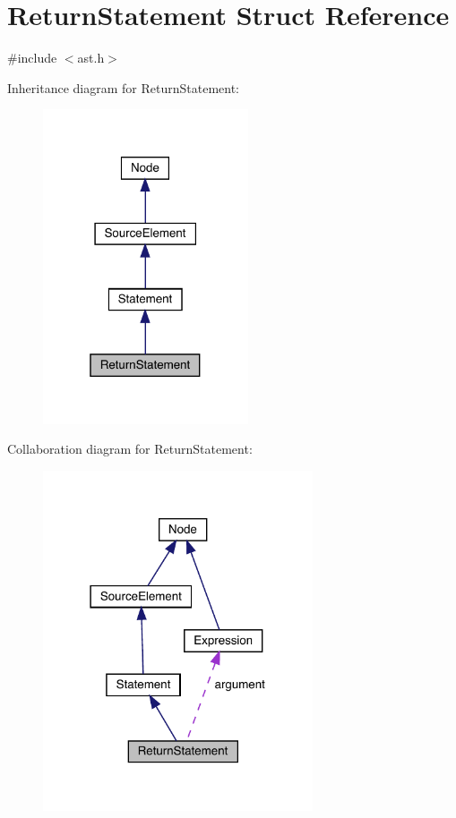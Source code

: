 \hypertarget{struct_return_statement}{}\section{Return\+Statement Struct Reference}
\label{struct_return_statement}


{\ttfamily \#include $<$ast.\+h$>$}



Inheritance diagram for Return\+Statement\+:
\nopagebreak
\begin{figure}[H]
\begin{center}
\leavevmode
\includegraphics[width=172pt]{struct_return_statement__inherit__graph}
\end{center}
\end{figure}


Collaboration diagram for Return\+Statement\+:
\nopagebreak
\begin{figure}[H]
\begin{center}
\leavevmode
\includegraphics[width=226pt]{struct_return_statement__coll__graph}
\end{center}
\end{figure}
